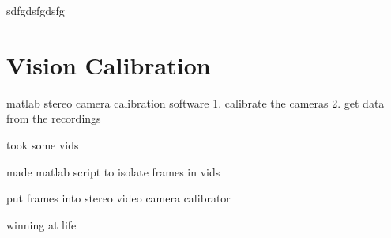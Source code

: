 sdfgdsfgdsfg







\section{Vision Calibration}


matlab stereo camera calibration software
1. calibrate the cameras
2. get data from the recordings

took some vids

made matlab script to isolate frames in vids

put frames into stereo video camera calibrator

winning at life


